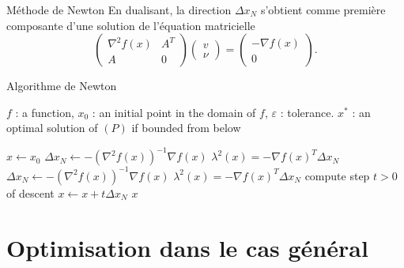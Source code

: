 \documentclass[aspectratio = 169]{beamer}
\begin{document}
\begin{frame}{Méthode de Newton}
  En dualisant, la direction $\Delta x_N$ s'obtient comme première
  composante d'une solution de l'équation matricielle
    \begin{equation}
    \label{KKT-PQb}
    \tag{KKT-$P_Q$}
    \begin{pmatrix}
      \nabla^2f(x) & A^T \\
      A & 0
    \end{pmatrix}
    \begin{pmatrix}
      v \\ \nu
    \end{pmatrix}
    =
    \begin{pmatrix}
      -\nabla f(x) \\ 0
    \end{pmatrix}.
  \end{equation}
\end{frame}

\begin{frame}{Algorithme de Newton}
    \begin{algorithm}[H]
    \caption{Méthode de Newton}
    \small{
      \begin{algorithmic}[1]
        \Statex
        \Require $f$ : a function,  $x_0$ : an initial point in the domain of $f$, $\varepsilon$ : tolerance.
        \Ensure $x^*$ : an optimal solution of $(P)$ if bounded from below

        \State $x \leftarrow x_0$
        \State $\Delta x_N \leftarrow -\left(\nabla^2 f(x)\right)^{-1}\nabla f(x)$
        \State $\lambda^2(x) = -\nabla f(x)^T\Delta x_N$
        \State $\Delta x_N \leftarrow -\left(\nabla^2 f(x)\right)^{-1}\nabla f(x)$
        \State $\lambda^2(x) = -\nabla f(x)^T\Delta x_N$
        \State compute step $t > 0$ of descent
        \State $x \leftarrow x + t\Delta x_N$
        \EndWhile
        \State \Return $x$
        \EndFunction
        \Statex
      \end{algorithmic}
    }
  \end{algorithm}
\end{frame}

\section{Optimisation dans le cas général}
\end{document}
